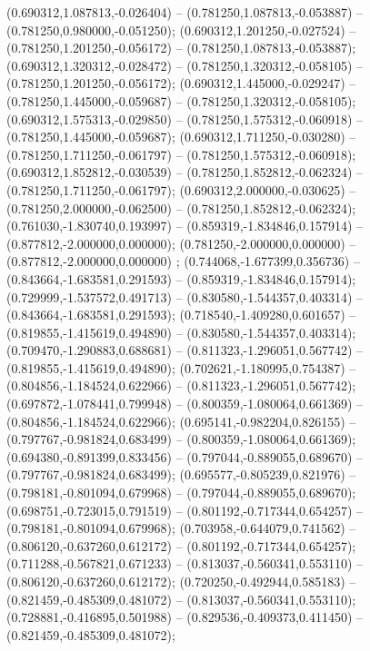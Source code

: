 (0.690312,1.087813,-0.026404) -- (0.781250,1.087813,-0.053887) -- (0.781250,0.980000,-0.051250);
 (0.690312,1.201250,-0.027524) -- (0.781250,1.201250,-0.056172) -- (0.781250,1.087813,-0.053887);
 (0.690312,1.320312,-0.028472) -- (0.781250,1.320312,-0.058105) -- (0.781250,1.201250,-0.056172);
 (0.690312,1.445000,-0.029247) -- (0.781250,1.445000,-0.059687) -- (0.781250,1.320312,-0.058105);
 (0.690312,1.575313,-0.029850) -- (0.781250,1.575312,-0.060918) -- (0.781250,1.445000,-0.059687);
 (0.690312,1.711250,-0.030280) -- (0.781250,1.711250,-0.061797) -- (0.781250,1.575312,-0.060918);
 (0.690312,1.852812,-0.030539) -- (0.781250,1.852812,-0.062324) -- (0.781250,1.711250,-0.061797);
 (0.690312,2.000000,-0.030625) -- (0.781250,2.000000,-0.062500) -- (0.781250,1.852812,-0.062324);
 (0.761030,-1.830740,0.193997) -- (0.859319,-1.834846,0.157914) -- (0.877812,-2.000000,0.000000);
 (0.781250,-2.000000,0.000000) -- (0.877812,-2.000000,0.000000) ;
 (0.744068,-1.677399,0.356736) -- (0.843664,-1.683581,0.291593) -- (0.859319,-1.834846,0.157914);
 (0.729999,-1.537572,0.491713) -- (0.830580,-1.544357,0.403314) -- (0.843664,-1.683581,0.291593);
 (0.718540,-1.409280,0.601657) -- (0.819855,-1.415619,0.494890) -- (0.830580,-1.544357,0.403314);
 (0.709470,-1.290883,0.688681) -- (0.811323,-1.296051,0.567742) -- (0.819855,-1.415619,0.494890);
 (0.702621,-1.180995,0.754387) -- (0.804856,-1.184524,0.622966) -- (0.811323,-1.296051,0.567742);
 (0.697872,-1.078441,0.799948) -- (0.800359,-1.080064,0.661369) -- (0.804856,-1.184524,0.622966);
 (0.695141,-0.982204,0.826155) -- (0.797767,-0.981824,0.683499) -- (0.800359,-1.080064,0.661369);
 (0.694380,-0.891399,0.833456) -- (0.797044,-0.889055,0.689670) -- (0.797767,-0.981824,0.683499);
 (0.695577,-0.805239,0.821976) -- (0.798181,-0.801094,0.679968) -- (0.797044,-0.889055,0.689670);
 (0.698751,-0.723015,0.791519) -- (0.801192,-0.717344,0.654257) -- (0.798181,-0.801094,0.679968);
 (0.703958,-0.644079,0.741562) -- (0.806120,-0.637260,0.612172) -- (0.801192,-0.717344,0.654257);
 (0.711288,-0.567821,0.671233) -- (0.813037,-0.560341,0.553110) -- (0.806120,-0.637260,0.612172);
 (0.720250,-0.492944,0.585183) -- (0.821459,-0.485309,0.481072) -- (0.813037,-0.560341,0.553110);
 (0.728881,-0.416895,0.501988) -- (0.829536,-0.409373,0.411450) -- (0.821459,-0.485309,0.481072);
